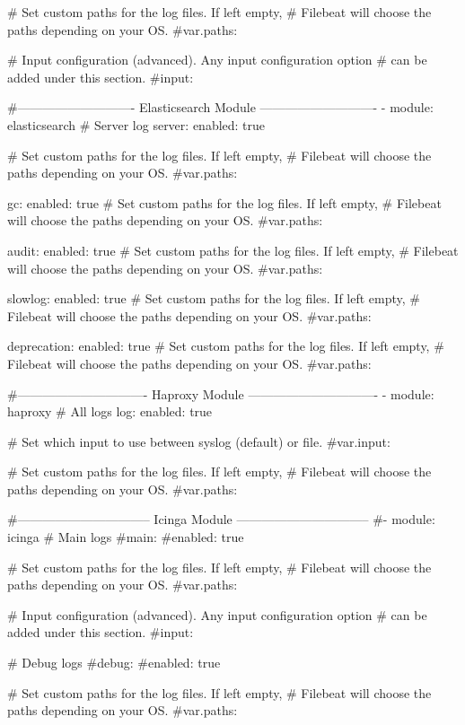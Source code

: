     # Set custom paths for the log files. If left empty,
    # Filebeat will choose the paths depending on your OS.
    #var.paths:

    # Input configuration (advanced). Any input configuration option
    # can be added under this section.
    #input:

#---------------------------- Elasticsearch Module ----------------------------
- module: elasticsearch
  # Server log
  server:
    enabled: true

    # Set custom paths for the log files. If left empty,
    # Filebeat will choose the paths depending on your OS.
    #var.paths:

  gc:
    enabled: true
    # Set custom paths for the log files. If left empty,
    # Filebeat will choose the paths depending on your OS.
    #var.paths:

  audit:
    enabled: true
    # Set custom paths for the log files. If left empty,
    # Filebeat will choose the paths depending on your OS.
    #var.paths:

  slowlog:
    enabled: true
    # Set custom paths for the log files. If left empty,
    # Filebeat will choose the paths depending on your OS.
    #var.paths:

  deprecation:
    enabled: true
    # Set custom paths for the log files. If left empty,
    # Filebeat will choose the paths depending on your OS.
    #var.paths:

#------------------------------- Haproxy Module -------------------------------
- module: haproxy
  # All logs
  log:
    enabled: true

    # Set which input to use between syslog (default) or file.
    #var.input:

    # Set custom paths for the log files. If left empty,
    # Filebeat will choose the paths depending on your OS.
    #var.paths:

#-------------------------------- Icinga Module --------------------------------
#- module: icinga
  # Main logs
  #main:
    #enabled: true

    # Set custom paths for the log files. If left empty,
    # Filebeat will choose the paths depending on your OS.
    #var.paths:

    # Input configuration (advanced). Any input configuration option
    # can be added under this section.
    #input:

  # Debug logs
  #debug:
    #enabled: true

    # Set custom paths for the log files. If left empty,
    # Filebeat will choose the paths depending on your OS.
    #var.paths:

